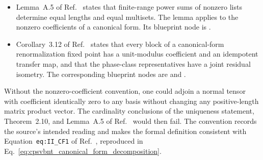 \documentclass{article}
\begin{document}
\begin{itemize}
    \item Lemma~A.5 of
          Ref.~\cite[lines 1155--1163]{Cirac2016MPDO_arXiv} states that
          finite-range power sums of nonzero lists determine equal lengths and
          equal multisets. The lemma applies to the nonzero coefficients of a
          canonical form. Its blueprint node is
          .

    \item Corollary~3.12 of
          Ref.~\cite[lines 583--590]{Cirac2016MPDO_arXiv} states that every
          block of a canonical-form renormalization fixed point has a
          unit-modulus coefficient and an idempotent transfer map, and that
          the phase-class representatives have a joint residual isometry. The
          corresponding blueprint nodes are
           and
          .
\end{itemize}

Without the nonzero-coefficient convention, one could adjoin a normal tensor
with coefficient identically zero to any basis without changing any
positive-length matrix product vector. The cardinality conclusions of the
uniqueness statement, Theorem~2.10, and Lemma~A.5 of
Ref.~\cite{Cirac2016MPDO_arXiv} would then fail. The convention records the
source's intended reading and makes the formal definition consistent with
Equation~\texttt{eq:II\_CF1} of Ref.~\cite{Cirac2016MPDO_arXiv}, reproduced in
Eq.~\ref{eq:cpsvbnt_canonical_form_decomposition}.



\end{document}
